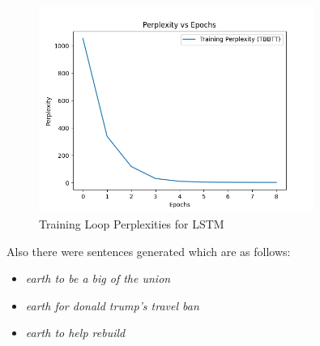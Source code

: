 \documentclass[a4paper]{article}
\begin{document}
\begin{enumerate}
          \begin{figure}[H]
              \centering
              \includegraphics[width=0.8\textwidth]{"./plots/TBBTT-training-loop-perplexities.png"}
              \caption{Training Loop Perplexities for LSTM}
              \label{fig:lstm-tbtt-training-loop-perplexities}
          \end{figure}

          Also there were sentences generated which are as follows:
          \begin{itemize}
              \item \textit{earth to be a big of the union}
              \item \textit{earth for donald trump's travel ban}
              \item \textit{earth to help rebuild}
          \end{itemize}
\end{enumerate}
\end{document}
